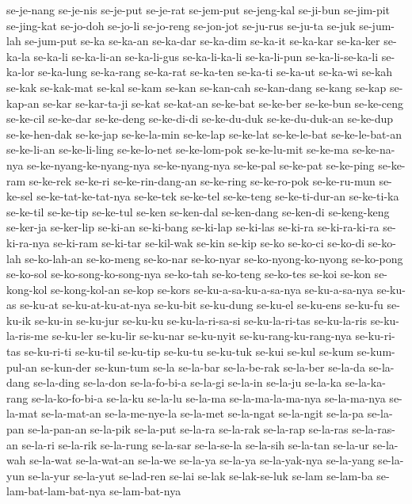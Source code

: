 {se-je-nang se-je-nis se-je-put se-je-rat se-jem-put se-jeng-kal se-ji-bun
se-jim-pit se-jing-kat se-jo-doh se-jo-li se-jo-reng se-jon-jot se-ju-rus
se-ju-ta se-juk se-jum-lah se-jum-put se-ka se-ka-an se-ka-dar se-ka-dim
se-ka-it se-ka-kar se-ka-ker se-ka-la se-ka-li se-ka-li-an se-ka-li-gus
se-ka-li-ka-li se-ka-li-pun se-ka-li-se-ka-li se-ka-lor se-ka-lung
se-ka-rang se-ka-rat se-ka-ten se-ka-ti se-ka-ut se-ka-wi se-kah se-kak
se-kak-mat se-kal se-kam se-kan se-kan-cah se-kan-dang se-kang se-kap
se-kap-an se-kar se-kar-ta-ji se-kat se-kat-an se-ke-bat se-ke-ber
se-ke-bun se-ke-ceng se-ke-cil se-ke-dar se-ke-deng se-ke-di-di
se-ke-du-duk se-ke-du-duk-an se-ke-dup se-ke-hen-dak se-ke-jap
se-ke-la-min se-ke-lap se-ke-lat se-ke-le-bat se-ke-le-bat-an se-ke-li-an
se-ke-li-ling se-ke-lo-net se-ke-lom-pok se-ke-lu-mit se-ke-ma
se-ke-na-nya se-ke-nyang-ke-nyang-nya se-ke-nyang-nya se-ke-pal se-ke-pat
se-ke-ping se-ke-ram se-ke-rek se-ke-ri se-ke-rin-dang-an se-ke-ring
se-ke-ro-pok se-ke-ru-mun se-ke-sel se-ke-tat-ke-tat-nya se-ke-tek
se-ke-tel se-ke-teng se-ke-ti-dur-an se-ke-ti-ka se-ke-til se-ke-tip
se-ke-tul se-ken se-ken-dal se-ken-dang se-ken-di se-keng-keng se-ker-ja
se-ker-lip se-ki-an se-ki-bang se-ki-lap se-ki-las se-ki-ra se-ki-ra-ki-ra
se-ki-ra-nya se-ki-ram se-ki-tar se-kil-wak se-kin se-kip se-ko se-ko-ci
se-ko-di se-ko-lah se-ko-lah-an se-ko-meng se-ko-nar se-ko-nyar
se-ko-nyong-ko-nyong se-ko-pong se-ko-sol se-ko-song-ko-song-nya se-ko-tah
se-ko-teng se-ko-tes se-koi se-kon se-kong-kol se-kong-kol-an se-kop
se-kors se-ku-a-sa-ku-a-sa-nya se-ku-a-sa-nya se-ku-as se-ku-at
se-ku-at-ku-at-nya se-ku-bit se-ku-dung se-ku-el se-ku-ens se-ku-fu
se-ku-ik se-ku-in se-ku-jur se-ku-ku se-ku-la-ri-sa-si se-ku-la-ri-tas
se-ku-la-ris se-ku-la-ris-me se-ku-ler se-ku-lir se-ku-nar se-ku-nyit
se-ku-rang-ku-rang-nya se-ku-ri-tas se-ku-ri-ti se-ku-til se-ku-tip
se-ku-tu se-ku-tuk se-kui se-kul se-kum se-kum-pul-an se-kun-der
se-kun-tum se-la se-la-bar se-la-be-rak se-la-ber se-la-da se-la-dang
se-la-ding se-la-don se-la-fo-bi-a se-la-gi se-la-in se-la-ju se-la-ka
se-la-ka-rang se-la-ko-fo-bi-a se-la-ku se-la-lu se-la-ma
se-la-ma-la-ma-nya se-la-ma-nya se-la-mat se-la-mat-an se-la-me-nye-la
se-la-met se-la-ngat se-la-ngit se-la-pa se-la-pan se-la-pan-an se-la-pik
se-la-put se-la-ra se-la-rak se-la-rap se-la-ras se-la-ras-an se-la-ri
se-la-rik se-la-rung se-la-sar se-la-se-la se-la-sih se-la-tan se-la-ur
se-la-wah se-la-wat se-la-wat-an se-la-we se-la-ya se-la-ya se-la-yak-nya
se-la-yang se-la-yun se-la-yur se-la-yut se-lad-ren se-lai se-lak
se-lak-se-luk se-lam se-lam-ba se-lam-bat-lam-bat-nya se-lam-bat-nya
}
